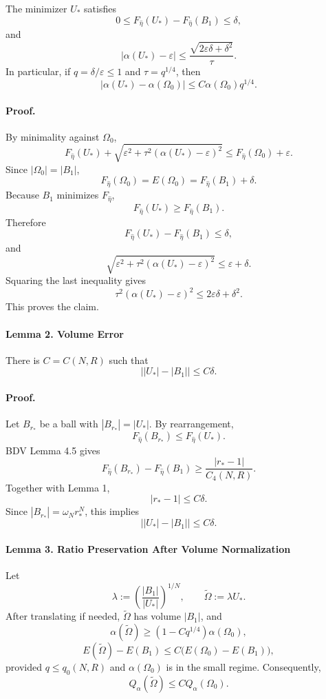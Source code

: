 \documentclass[11pt]{amsart}
\theoremstyle{definition}
\begin{document}
The minimizer \(U_*\) satisfies
\[
0\le
F_{\hat\eta}(U_*)-F_{\hat\eta}(B_1)
\le
\delta,
\]
and
\[
|\alpha(U_*)-\varepsilon|
\le
\frac{\sqrt{2\varepsilon\delta+\delta^2}}{\tau}.
\]
In particular, if \(q=\delta/\varepsilon\le1\) and \(\tau=q^{1/4}\), then
\[
|\alpha(U_*)-\alpha(\Omega_0)|
\le
C\alpha(\Omega_0)q^{1/4}.
\]

\paragraph{Proof.}
By minimality against \(\Omega_0\),
\[
F_{\hat\eta}(U_*)
+
\sqrt{\varepsilon^2+\tau^2(\alpha(U_*)-\varepsilon)^2}
\le
F_{\hat\eta}(\Omega_0)+\varepsilon.
\]
Since \(|\Omega_0|=|B_1|\),
\[
F_{\hat\eta}(\Omega_0)=E(\Omega_0)
=F_{\hat\eta}(B_1)+\delta.
\]
Because \(B_1\) minimizes \(F_{\hat\eta}\),
\[
F_{\hat\eta}(U_*)\ge F_{\hat\eta}(B_1).
\]
Therefore
\[
F_{\hat\eta}(U_*)-F_{\hat\eta}(B_1)\le\delta,
\]
and
\[
\sqrt{\varepsilon^2+\tau^2(\alpha(U_*)-\varepsilon)^2}
\le
\varepsilon+\delta.
\]
Squaring the last inequality gives
\[
\tau^2(\alpha(U_*)-\varepsilon)^2
\le
2\varepsilon\delta+\delta^2.
\]
This proves the claim.

\paragraph{Lemma 2. Volume Error}

There is \(C=C(N,R)\) such that
\[
\bigl||U_*|-|B_1|\bigr|
\le
C\delta.
\]

\paragraph{Proof.}
Let \(B_{r_*}\) be a ball with \(|B_{r_*}|=|U_*|\). By rearrangement,
\[
F_{\hat\eta}(B_{r_*})\le F_{\hat\eta}(U_*).
\]
BDV Lemma 4.5 gives
\[
F_{\hat\eta}(B_{r_*})-F_{\hat\eta}(B_1)
\ge
\frac{|r_*-1|}{C_4(N,R)}.
\]
Together with Lemma 1,
\[
|r_*-1|\le C\delta.
\]
Since \(|B_{r_*}|=\omega_N r_*^N\), this implies
\[
\bigl||U_*|-|B_1|\bigr|\le C\delta.
\]

\paragraph{Lemma 3. Ratio Preservation After Volume Normalization}

Let
\[
\lambda:=\left(\frac{|B_1|}{|U_*|}\right)^{1/N},
\qquad
\widetilde\Omega:=\lambda U_*.
\]
After translating if needed, \(\widetilde\Omega\) has volume \(|B_1|\), and
\[
\alpha(\widetilde\Omega)
\ge
\left(1-Cq^{1/4}\right)\alpha(\Omega_0),
\]
\[
E(\widetilde\Omega)-E(B_1)
\le
C\big(E(\Omega_0)-E(B_1)\big),
\]
provided \(q\le q_0(N,R)\) and \(\alpha(\Omega_0)\) is in the small regime.
Consequently,
\[
Q_\alpha(\widetilde\Omega)
\le
C Q_\alpha(\Omega_0).
\]
\end{document}
